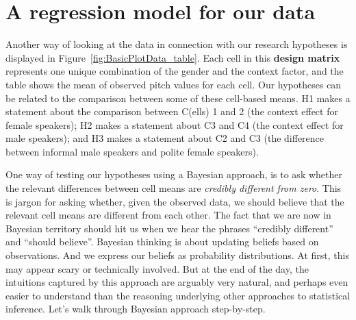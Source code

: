 \documentclass[nobib]{tufte-handout}
\newcommand{\tr}[1]{\textcolor{DarkOrange}{[tr: #1]}}
\begin{document}
\section{A regression model for our data}

Another way of looking at the data in connection with our research hypotheses is displayed in
Figure~\ref{fig:BasicPlotData_table}. Each cell in this \textbf{design matrix} represents one
unique combination of the gender and the context factor, and the table shows the mean of
observed pitch values for each cell.
%
%
Our hypotheses can be related to the comparison between some of these cell-based means.
H1 makes a statement about the comparison between C(ells) 1 and 2 (the context effect for female speakers); H2 makes a statement about C3 and C4 (the context effect for male speakers); and H3 makes a statement about C2 and C3 (the difference between informal male speakers and polite female speakers).

One way of testing our hypotheses using a Bayesian approach, is to ask whether the relevant differences between cell means are \textit{credibly different from zero}. This is jargon for asking whether, given the observed data, we should believe that the relevant cell means are different from each other. The fact that we are now in Bayesian territory should hit us when we hear the phrases ``credibly different'' and ``should believe''. Bayesian thinking is about updating beliefs based on observations. And we express our beliefs as probability distributions. 
At first, this may appear scary or technically involved. But at the end of the day, the intuitions captured by this approach are arguably very natural, and perhaps even easier to understand than the reasoning underlying other approaches to statistical inference. Let's walk through Bayesian approach step-by-step.
\end{document}
